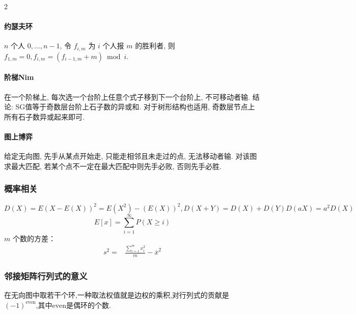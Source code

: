 \begin{footnotesize}
\begin{multicols}{2}
\paragraph{约瑟夫环}$n$ 个人 $0,\dots,n-1$, 令 $f_{i,m}$ 为 $i$ 个人报 $m$ 的胜利者, 则 $f_{1,m}=0,f_{i,m}=(f_{i-1,m}+m)\bmod i$. 
\paragraph{阶梯Nim} 在一个阶梯上, 每次选一个台阶上任意个式子移到下一个台阶上, 不可移动者输. 结论: SG值等于奇数层台阶上石子数的异或和. 对于树形结构也适用, 奇数层节点上所有石子数异或起来即可.
\paragraph{图上博弈} 给定无向图, 先手从某点开始走, 只能走相邻且未走过的点, 无法移动者输. 对该图求最大匹配, 若某个点不一定在最大匹配中则先手必败, 否则先手必胜.
\end{multicols}


\subsubsection{概率相关}
$D(X)=E(X-E(X))^2=E(X^2)-(E(X))^2,D(X+Y)=D(X)+D(Y)D(aX)=a^2D(X)$
\[E[x]=\sum_{i=1}^{\infty}P(X\geq i)\]
$m$ 个数的方差：
$$\begin{aligned}s^2=&\frac{\sum_{i=1}^m x_i^2}m-\overline x^2\end{aligned}$$

\subsubsection{邻接矩阵行列式的意义}
在无向图中取若干个环,一种取法权值就是边权的乘积,对行列式的贡献是$(-1)^{\mathrm{even}}$,其中$\mathrm{even}$是偶环的个数.


\end{footnotesize}
